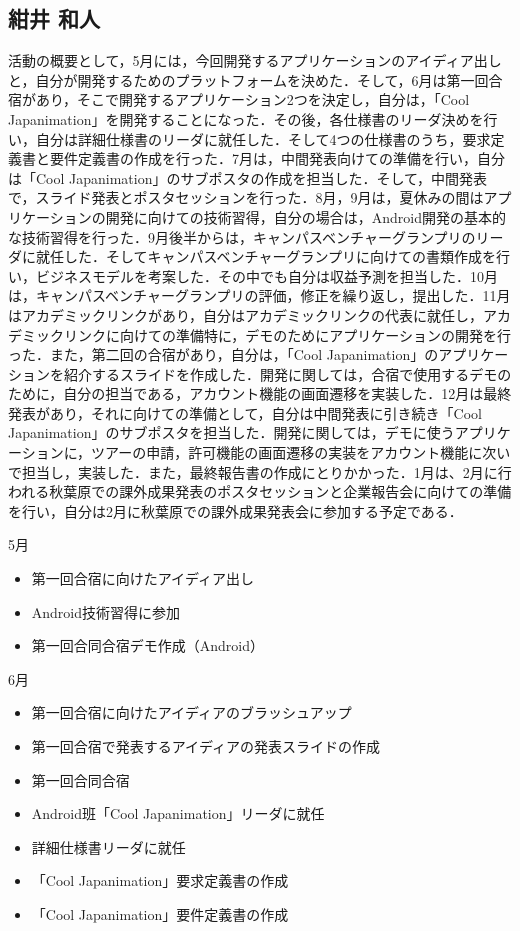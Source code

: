 \subsection{紺井 和人}
\par
活動の概要として，5月には，今回開発するアプリケーションのアイディア出しと，自分が開発するためのプラットフォームを決めた．そして，6月は第一回合宿があり，そこで開発するアプリケーション2つを決定し，自分は，「Cool Japanimation」を開発することになった．その後，各仕様書のリーダ決めを行い，自分は詳細仕様書のリーダに就任した．そして4つの仕様書のうち，要求定義書と要件定義書の作成を行った．7月は，中間発表向けての準備を行い，自分は「Cool Japanimation」のサブポスタの作成を担当した．そして，中間発表で，スライド発表とポスタセッションを行った．8月，9月は，夏休みの間はアプリケーションの開発に向けての技術習得，自分の場合は，Android開発の基本的な技術習得を行った．9月後半からは，キャンパスベンチャーグランプリのリーダに就任した．そしてキャンパスベンチャーグランプリに向けての書類作成を行い，ビジネスモデルを考案した．その中でも自分は収益予測を担当した．10月は，キャンパスベンチャーグランプリの評価，修正を繰り返し，提出した．11月はアカデミックリンクがあり，自分はアカデミックリンクの代表に就任し，アカデミックリンクに向けての準備特に，デモのためにアプリケーションの開発を行った．また，第二回の合宿があり，自分は，「Cool Japanimation」のアプリケーションを紹介するスライドを作成した．開発に関しては，合宿で使用するデモのために，自分の担当である，アカウント機能の画面遷移を実装した．12月は最終発表があり，それに向けての準備として，自分は中間発表に引き続き「Cool Japanimation」のサブポスタを担当した．開発に関しては，デモに使うアプリケーションに，ツアーの申請，許可機能の画面遷移の実装をアカウント機能に次いで担当し，実装した．また，最終報告書の作成にとりかかった．1月は、2月に行われる秋葉原での課外成果発表のポスタセッションと企業報告会に向けての準備を行い，自分は2月に秋葉原での課外成果発表会に参加する予定である．
\par
5月
\begin{itemize}
\item 第一回合宿に向けたアイディア出し
\item Android技術習得に参加
\item 第一回合同合宿デモ作成（Android）
\end{itemize}
6月
\begin{itemize}
\item 第一回合宿に向けたアイディアのブラッシュアップ
\item 第一回合宿で発表するアイディアの発表スライドの作成
\item 第一回合同合宿
\item Android班「Cool Japanimation」リーダに就任
\item 詳細仕様書リーダに就任
\item 「Cool Japanimation」要求定義書の作成
\item 「Cool Japanimation」要件定義書の作成
\end{itemize}
